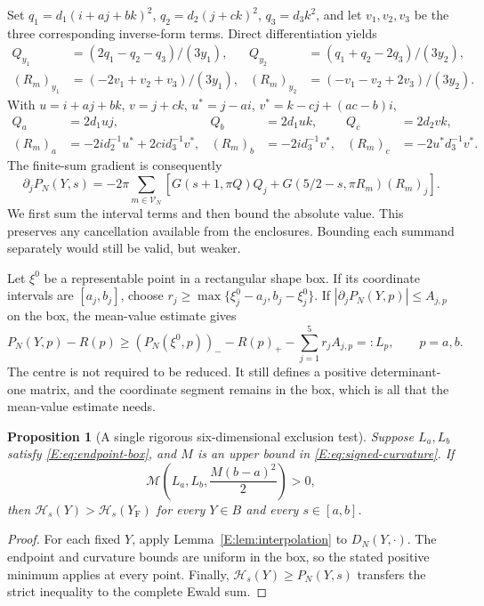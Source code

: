\documentclass[reqno,english]{amsart}
\newtheorem{proposition}[theorem]{Proposition}
\theoremstyle{definition}
\newtheorem{open problem}[theorem]{Open Problem}
\theoremstyle{remark}
\theoremstyle{plain}
\numberwithin{equation}{section}
\newcommand{\YF}{Y_{\mathrm F}}
\newcommand{\HH}{\mathcal H}
\begin{document}
Set $q_1=d_1(i+aj+bk)^2$, $q_2=d_2(j+ck)^2$, $q_3=d_3k^2$, and let $v_1,v_2,v_3$ be the three corresponding inverse-form terms. Direct differentiation yields
\begin{align}
 Q_{y_1}&=(2q_1-q_2-q_3)/(3y_1),&
 Q_{y_2}&=(q_1+q_2-2q_3)/(3y_2),\\
 (R_m)_{y_1}&=(-2v_1+v_2+v_3)/(3y_1),&
 (R_m)_{y_2}&=(-v_1-v_2+2v_3)/(3y_2).
 \label{E:eq:y-derivatives}
\end{align}
With $u=i+aj+bk$, $v=j+ck$, $u^*=j-ai$, $v^*=k-cj+(ac-b)i$,
\begin{align}
 Q_a&=2d_1uj,&Q_b&=2d_1uk,&Q_c&=2d_2vk,\\
 (R_m)_a&=-2id_2^{-1}u^*+2cid_3^{-1}v^*,&
 (R_m)_b&=-2id_3^{-1}v^*,&
 (R_m)_c&=-2u^*d_3^{-1}v^*.
 \label{E:eq:shear-derivatives}
\end{align}
The finite-sum gradient is consequently
\begin{equation}
 \partial_jP_N(Y,s)=-2\pi\sum_{m\in\mathcal V_N}
 [G(s+1,\pi Q)Q_j+G(5/2-s,\pi R_m)(R_m)_j].
 \label{E:eq:finite-gradient}
\end{equation}
We first sum the interval terms and then bound the absolute value.
This preserves any cancellation available from the enclosures.
Bounding each summand separately would still be valid, but weaker.

Let $\xi^0$ be a representable point in a rectangular shape box.
If its coordinate intervals are $[a_j,b_j]$, choose
$r_j\ge\max\{\xi_j^0-a_j,b_j-\xi_j^0\}$. If
$|\partial_jP_N(Y,p)|\le A_{j,p}$ on the box, the mean-value estimate gives
\begin{equation}
 P_N(Y,p)-R(p)\ge
 (P_N(\xi^0,p))_- -R(p)_+-\sum_{j=1}^5r_jA_{j,p}
 =:L_p,\qquad p=a,b.
 \label{E:eq:endpoint-box}
\end{equation}
The centre is not required to be reduced. It still defines a positive
determinant-one matrix, and the coordinate segment remains in the
box, which is all that the mean-value estimate needs.

\begin{proposition}[A single rigorous six-dimensional exclusion test]\label{E:prop:cell-test}
Suppose $L_a,L_b$ satisfy \eqref{E:eq:endpoint-box}, and $M$ is an upper bound in \eqref{E:eq:signed-curvature}. If
\begin{equation}
 \mathscr M\left(L_a,L_b,\frac{M(b-a)^2}{2}\right)>0,
 \label{E:eq:low-cell-certificate}
\end{equation}
then $\HH_s(Y)>\HH_s(\YF)$ for every $Y\in B$ and every $s\in[a,b]$.
\end{proposition}
\begin{proof}
For each fixed $Y$, apply Lemma~\ref{E:lem:interpolation} to
$D_N(Y,\cdot)$. The endpoint and curvature bounds are uniform in
the box, so the stated positive minimum applies at every point.
Finally, $\HH_s(Y)\ge P_N(Y,s)$ transfers the strict inequality
to the complete Ewald sum.
\end{proof}
\end{document}
